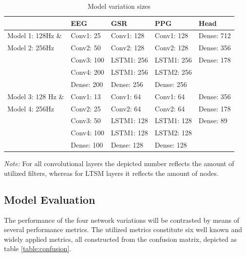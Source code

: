 \documentclass[12pt]{article}
\begin{document}
\bgroup
\def\arraystretch{1.6}%
\begin{table}[h]
\centering
\caption{Model variation sizes}
\label{table:modelvariations}
\begin{tabular}{lllll}
\hline
                   & EEG        & GSR        & PPG        & Head       \\ \hline
Model 1: 128Hz \&  & Conv1: 25  & Conv1: 128 & Conv1: 128 & Dense: 712 \\
Model 2: 256Hz     & Conv2: 50  & Conv2: 128 & Conv2: 128 & Dense: 356 \\
                   & Conv3: 100 & LSTM1: 256 & LSTM1: 256 & Dense: 178 \\
                   & Conv4: 200 & LSTM1: 256 & LSTM2: 256 &            \\
                   \vspace{3ex}
                   & Dense: 200 & Dense: 256 & Dense: 256 &            \\ \hline
Model 3: 128 Hz \& & Conv1: 13  & Conv1: 64  & Conv1: 64  & Dense: 356 \\
Model 4: 256Hz     & Conv2: 25  & Conv2: 64  & Conv2: 64  & Dense: 178 \\
                   & Conv3: 50  & LSTM1: 128 & LSTM1: 128 & Dense: 89  \\
                   & Conv4: 100 & LSTM1: 128 & LSTM2: 128 &            \\
                   & Dense: 100 & Dense: 128 & Dense: 128 &            \\ \hline
\end{tabular}
\vspace{2ex}

\begin{doublespacing}
{\raggedright \textit{Note:} For all convolutional layers the depicted number reflects the amount of utilized filters, whereas for LTSM layers it reflects the amount  of nodes. \par}
\end{doublespacing}
\end{table}
\egroup


\clearpage
\subsection{Model Evaluation}
The performance of the four network variations will be contrasted by means of several performance metrics. The utilized metrics constitute six well known and widely applied metrics, all constructed from the confusion matrix, depicted as table \ref{table:confusion}.
\end{document}
